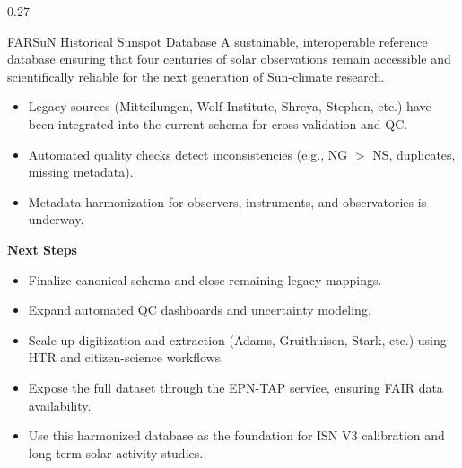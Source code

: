 \documentclass[final]{beamer}
\newenvironment{tightblock}[1]{%
  \begin{block}{#1}\vspace{0.6em}
}{\vspace{0.6em}\end{block}}
\begin{document}
\begin{frame}[t]
\begin{columns}[t,totalwidth=0.98\paperwidth]
\begin{column}{0.27\paperwidth}
%
\begin{tightblock}{FARSuN Historical Sunspot Database} %
  A sustainable, interoperable reference database ensuring that four centuries of solar observations remain accessible and scientifically reliable for the next generation of Sun-climate research. \\
  \begin{itemize}
    \item Legacy sources (Mitteilungen, Wolf Institute, Shreya, Stephen, etc.) have been integrated into the current schema for cross-validation and QC.
    \item Automated quality checks detect inconsistencies (e.g., NG $>$ NS, duplicates, missing metadata).
    \item Metadata harmonization for observers, instruments, and observatories is underway.%
  \end{itemize}

  \textbf{Next Steps}
  \begin{itemize}
    \item Finalize canonical schema and close remaining legacy mappings.
    \item Expand automated QC dashboards and uncertainty modeling.
    \item Scale up digitization and extraction (Adams, Gruithuisen, Stark, etc.) using HTR and citizen-science workflows.
    \item Expose the full dataset through the EPN-TAP service, ensuring FAIR data availability.
    \item Use this harmonized database as the foundation for ISN V3 calibration and long-term solar activity studies.
  \end{itemize}


\end{tightblock}
\end{column}
\end{columns}
\end{frame}
\end{document}
